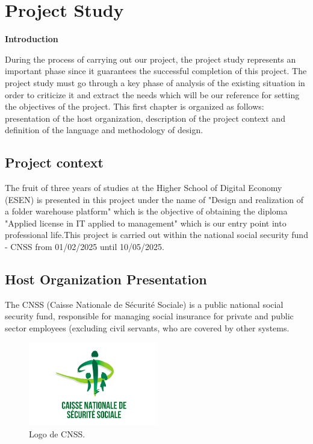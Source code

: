 \chapter{Project Study}
\newpage
\begin{center}
    \centering
    \LARGE\textbf{Introduction} 
     \vspace{1cm} \\
   \raggedright
\end{center}
During the process of carrying out our project, the project study represents an important phase since it guarantees the successful completion of this project. The project study must go through a key phase of analysis of the existing situation in order to criticize it and extract the needs which will be our reference for setting the objectives of the project. This first chapter is organized as follows: presentation of the host organization, description of the project context and definition of the language and methodology of design.

\section{ Project context}
The fruit of three years of studies at the Higher School of Digital Economy (ESEN) is presented in this project under the name of "Design and realization of a folder warehouse platform" which is the objective of obtaining the diploma "Applied license in IT applied to management" which is our entry point into professional life.This project is carried out within the national social security fund - CNSS from 01/02/2025 until 10/05/2025.
\section{Host Organization Presentation}
The CNSS (Caisse Nationale de Sécurité Sociale) is a public national social security fund, responsible for managing social insurance for private and public sector employees (excluding civil servants, who are covered by other systems.\\

\begin{figure}[htbp]
    \centering
    \includegraphics[width=0.5\textwidth]{figures/logocnss.png}
    \caption{Logo de CNSS.}
\end{figure} \

